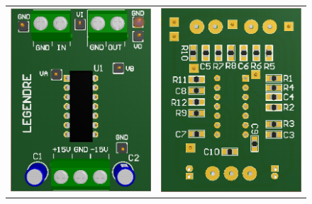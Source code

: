 \begin{figure}[H]
	\centering
	\begin{tabular}{c c}
		\includegraphics[scale=0.5]{../EJ1/Recursos/legendre_top_3d.PNG} & 
		\includegraphics[scale=0.5]{../EJ1/Recursos/legendre_bottom_3d.PNG} \\

\end{tabular}
\end{figure}
